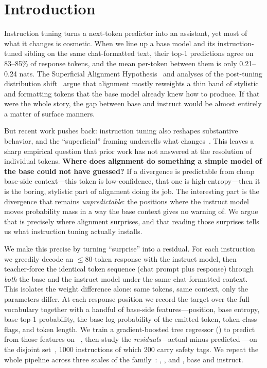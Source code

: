 \section{Introduction}\label{sec:intro}

Instruction tuning turns a next-token predictor into an assistant, yet most of what it changes is cosmetic. When we line up a base model and its instruction-tuned sibling on the same chat-formatted text, their top-1 predictions agree on 83--85\% of response tokens, and the mean per-token \klt{} between them is only 0.21--0.24 nats. The Superficial Alignment Hypothesis~\citep{zhou2023lima} and analyses of the post-tuning distribution shift~\citep{lin2023urial} argue that alignment mostly reweights a thin band of stylistic and formatting tokens that the base model already knew how to produce. If that were the whole story, the gap between base and instruct would be almost entirely a matter of surface manners.

But recent work pushes back: instruction tuning also reshapes substantive behavior, and the ``superficial'' framing undersells what changes~\citep{revisiting2024superficial}. This leaves a sharp empirical question that prior work has not answered at the resolution of individual tokens. {\bf Where does alignment do something a simple model of the base could not have guessed?} If a divergence is predictable from cheap base-side context---this token is low-confidence, that one is high-entropy---then it is the boring, stylistic part of alignment doing its job. The interesting part is the divergence that remains \emph{unpredictable}: the positions where the instruct model moves probability mass in a way the base context gives no warning of. We argue that is precisely where alignment surprises, and that reading those surprises tells us what instruction tuning actually installs.

 We make this precise by turning ``surprise'' into a residual. For each instruction we greedily decode an \(\leq 80\)-token response with the instruct model, then teacher-force the identical token sequence (chat prompt plus response) through \emph{both} the base and the instruct model under the same chat-formatted context. This isolates the weight difference alone: same tokens, same context, only the parameters differ. At each response position we record the target \klt{} over the full vocabulary together with a handful of base-side features---position, base entropy, base top-1 probability, the base log-probability of the emitted token, token-class flags, and token length. We train a gradient-boosted tree regressor (\gbt) to predict \klt{} from those features on \dolly{}~\citep{dolly2023}, then study the \emph{residuals}---actual minus predicted \klt{}---on the disjoint \justeval{} set~\citep{lin2023urial}, 1000 instructions of which 200 carry safety tags. We repeat the whole pipeline across three scales of the \qwen{} family~\citep{qwen2025}: \qwensmall{}, \qwenmid{}, and \qwenbig{}, base and instruct.

